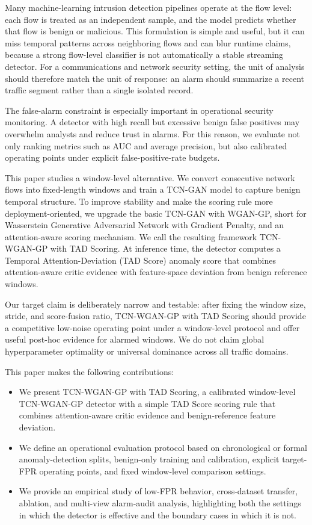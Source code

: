 \documentclass[conference]{IEEEtran}
\newcommand{\model}{TCN-WGAN-GP with TAD Scoring}
\newcommand{\tad}{TAD Score}
\begin{document}
Many machine-learning intrusion detection pipelines operate at the flow level: each flow is treated as an independent sample, and the model predicts whether that flow is benign or malicious. This formulation is simple and useful, but it can miss temporal patterns across neighboring flows and can blur runtime claims, because a strong flow-level classifier is not automatically a stable streaming detector. For a communications and network security setting, the unit of analysis should therefore match the unit of response: an alarm should summarize a recent traffic segment rather than a single isolated record.

The false-alarm constraint is especially important in operational security monitoring. A detector with high recall but excessive benign false positives may overwhelm analysts and reduce trust in alarms. For this reason, we evaluate not only ranking metrics such as AUC and average precision, but also calibrated operating points under explicit false-positive-rate budgets.

This paper studies a window-level alternative. We convert consecutive network flows into fixed-length windows and train a TCN-GAN model to capture benign temporal structure. To improve stability and make the scoring rule more deployment-oriented, we upgrade the basic TCN-GAN with WGAN-GP, short for Wasserstein Generative Adversarial Network with Gradient Penalty, and an attention-aware scoring mechanism. We call the resulting framework \model{}. At inference time, the detector computes a Temporal Attention-Deviation (\tad{}) anomaly score that combines attention-aware critic evidence with feature-space deviation from benign reference windows.

Our target claim is deliberately narrow and testable: after fixing the window size, stride, and score-fusion ratio, \model{} should provide a competitive low-noise operating point under a window-level protocol and offer useful post-hoc evidence for alarmed windows. We do not claim global hyperparameter optimality or universal dominance across all traffic domains.

This paper makes the following contributions:
\begin{itemize}
  \item We present \model{}, a calibrated window-level TCN-WGAN-GP detector with a simple \tad{} scoring rule that combines attention-aware critic evidence and benign-reference feature deviation.
  \item We define an operational evaluation protocol based on chronological or formal anomaly-detection splits, benign-only training and calibration, explicit target-FPR operating points, and fixed window-level comparison settings.
  \item We provide an empirical study of low-FPR behavior, cross-dataset transfer, ablation, and multi-view alarm-audit analysis, highlighting both the settings in which the detector is effective and the boundary cases in which it is not.
\end{itemize}
\end{document}
